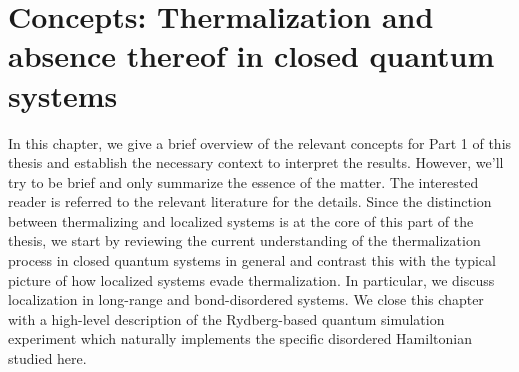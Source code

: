 \chapter{Concepts: Thermalization and absence thereof in closed quantum systems}\label{ch:concepts-thermalization}



In this chapter, we give a brief overview of the relevant concepts for Part 1 of this thesis and establish the necessary context to interpret the results. However, we'll try to be brief and only summarize the essence of the matter. The interested reader is referred to the relevant literature for the details.
Since the distinction between thermalizing and localized systems is at the core of this part of the thesis, we start by reviewing the current understanding of the thermalization process in closed quantum systems in general and contrast this with the typical picture of how localized systems evade thermalization. In particular, we discuss localization in long-range and bond-disordered systems. We close this chapter with a high-level description of the Rydberg-based quantum simulation experiment which naturally implements the specific disordered Hamiltonian studied here.  


